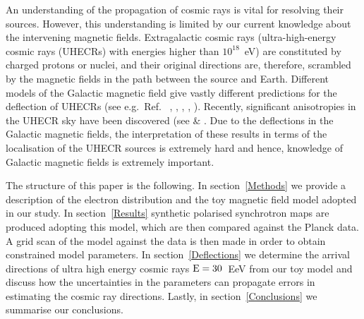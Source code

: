 \documentclass[usenatbib]{mnras}
\newcommand{\Arjen}[1]{{\color{brown}#1}}
\newcommand{\Vasu}[1]{{\color{purple}#1}}
\begin{document}

An understanding of the propagation of cosmic rays is vital for resolving their sources. However, this understanding is limited by our current knowledge about the intervening magnetic fields. Extragalactic cosmic rays (ultra-high-energy cosmic rays (UHECRs) with energies higher than $10^{18}$~eV) are constituted by charged protons or nuclei, and their original directions are, therefore, scrambled by the magnetic fields in the path between the source and Earth. Different models of the Galactic magnetic field give vastly different predictions for the deflection of UHECRs (see e.g.~Ref.~ \cite{JF12}, \cite{FARRAR_2014}, \cite{PT11_2011}, \cite{Sun_2008}, \cite{Sun_2010}). Recently, significant anisotropies in the UHECR sky have been discovered (see \cite{TA_2014} \cite{ICRC_2021} \cite{Auger_Starburst2018} \& \cite{ICRC_2019}. Due to the deflections in the Galactic magnetic fields, the interpretation of these results in terms of the localisation of the UHECR sources is extremely hard and hence, knowledge of Galactic magnetic fields is extremely important. 
%


The structure of this paper is the following. In section~\ref{Methods} we provide a description of the electron distribution and the toy magnetic field model adopted in our study. In section~\ref{Results} synthetic polarised synchrotron maps are produced adopting this model, which are then compared against the Planck data. A grid scan of the model against the data is then made in order to obtain constrained model parameters. In section~\ref{Deflections} we determine the arrival directions of ultra high energy cosmic rays $\rm E = 30$~EeV from our toy model and discuss how the uncertainties in the parameters can propagate errors in estimating the cosmic ray directions. %
Lastly, in section~\ref{Conclusions} we summarise our conclusions.
\end{document}
